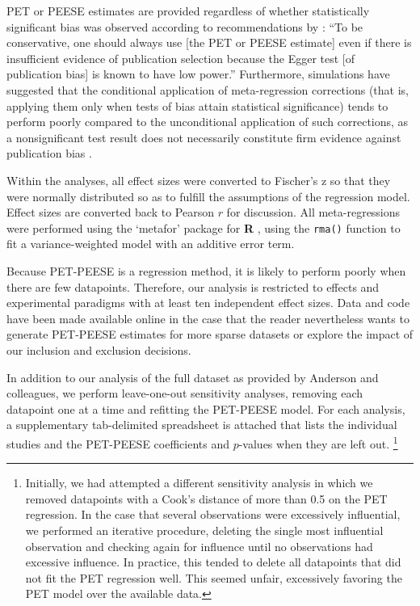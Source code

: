 \documentclass[man]{apa6}
\begin{document}
PET or PEESE estimates are provided regardless of whether statistically significant bias was observed according to recommendations by \citet[p. 20-21]{Stanley:Doucouliagos:2013}: ``To be conservative, one should always use [the PET or PEESE estimate] even if there is insufficient evidence of publication selection because the Egger test [of publication bias] is known to have low power.'' Furthermore, simulations have suggested that the conditional application of meta-regression corrections (that is, applying them only when tests of bias attain statistical significance) tends to perform poorly compared to the unconditional application of such corrections, as a nonsignificant test result does not necessarily constitute firm evidence against publication bias \citep{Moreno:etal:2006}.

Within the analyses, all effect sizes were converted to Fischer's z so that they were normally distributed so as to fulfill the assumptions of the regression model. Effect sizes are converted back to Pearson $r$ for discussion. All meta-regressions were performed using the `metafor' package for {\bf R} \citep{Viechtbauer:2010}, using the {\tt rma()} function to fit a variance-weighted model with an additive error term.

Because PET-PEESE is a regression method, it is likely to perform poorly when there are few datapoints. Therefore, our analysis is restricted to effects and experimental paradigms with at least ten independent effect sizes. %
Data and code have been made available online in the case that the reader nevertheless wants to generate PET-PEESE estimates for more sparse datasets or explore the impact of our inclusion and exclusion decisions.

In addition to our analysis of the full dataset as provided by Anderson and colleagues, we perform leave-one-out sensitivity analyses, removing each datapoint one at a time and refitting the PET-PEESE model. For each analysis, a supplementary tab-delimited spreadsheet is attached that lists the individual studies and the PET-PEESE coefficients and $p$-values when they are left out. \footnote{Initially, we had attempted a different sensitivity analysis in which we removed datapoints with a Cook's distance of more than 0.5 on the PET regression. In the case that several observations were excessively influential, we performed an iterative procedure, deleting the single most influential observation and checking again for influence until no observations had excessive influence. In practice, this tended to delete all datapoints that did not fit the PET regression well. This seemed unfair, excessively favoring the PET model over the available data.}
\end{document}
